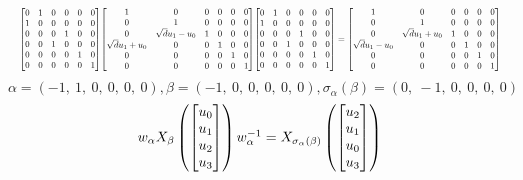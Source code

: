 \documentclass[11pt]{article}
\theoremstyle{definition}
\begin{document}
\[
\scaletoalign{\textwidth}{{\left[\begin{matrix}0 & 1 & 0 & 0 & 0 & 0\\1 & 0 & 0 & 0 & 0 & 0\\0 & 0 & 0 & 1 & 0 & 0\\0 & 0 & 1 & 0 & 0 & 0\\0 & 0 & 0 & 0 & 1 & 0\\0 & 0 & 0 & 0 & 0 & 1\end{matrix}\right]} {\left[\begin{matrix}1 & 0 & 0 & 0 & 0 & 0\\0 & 1 & 0 & 0 & 0 & 0\\0 & \sqrt{d} u_{1} - u_{0} & 1 & 0 & 0 & 0\\\sqrt{d} u_{1} + u_{0} & 0 & 0 & 1 & 0 & 0\\0 & 0 & 0 & 0 & 1 & 0\\0 & 0 & 0 & 0 & 0 & 1\end{matrix}\right]} {\left[\begin{matrix}0 & 1 & 0 & 0 & 0 & 0\\1 & 0 & 0 & 0 & 0 & 0\\0 & 0 & 0 & 1 & 0 & 0\\0 & 0 & 1 & 0 & 0 & 0\\0 & 0 & 0 & 0 & 1 & 0\\0 & 0 & 0 & 0 & 0 & 1\end{matrix}\right]} = {\left[\begin{matrix}1 & 0 & 0 & 0 & 0 & 0\\0 & 1 & 0 & 0 & 0 & 0\\0 & \sqrt{d} u_{1} + u_{0} & 1 & 0 & 0 & 0\\\sqrt{d} u_{1} - u_{0} & 0 & 0 & 1 & 0 & 0\\0 & 0 & 0 & 0 & 1 & 0\\0 & 0 & 0 & 0 & 0 & 1\end{matrix}\right]}}
\]
\[
\alpha = \left( -1, \  1, \  0, \  0, \  0, \  0\right), \beta = \left( -1, \  0, \  0, \  0, \  0, \  0\right), \sigma_{\alpha}(\beta) = \left( 0, \  -1, \  0, \  0, \  0, \  0\right)
\]
\[
\scaletoalign{\textwidth}{w_{\alpha} X_{\beta}\left(\left[\begin{matrix}u_{0}\\u_{1}\\u_{2}\\u_{3}\end{matrix}\right]\right) w_{\alpha}^{-1} = X_{\sigma_{\alpha}\left(\beta\right)}\left(\left[\begin{matrix}u_{2}\\u_{1}\\u_{0}\\u_{3}\end{matrix}\right]\right)}
\]
\end{document}
